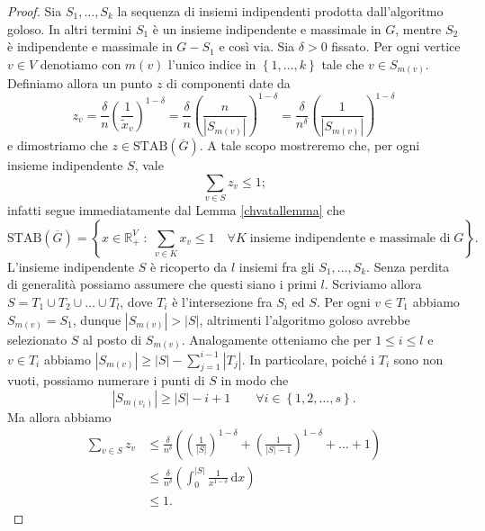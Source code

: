 \begin{proof}
  Sia \(S_1,\dots,S_k\) la sequenza di insiemi indipendenti prodotta dall'algoritmo goloso. In altri termini \(S_1\) è un insieme indipendente e massimale in \(G\), mentre \(S_2\) è indipendente e massimale in \(G-S_1\) e così via. Sia \(\delta>0\) fissato. Per ogni vertice \(v\in V\) denotiamo con \(m(v)\) l'unico indice in \(\left\{1,\dots,k\right\}\) tale che \(v\in S_{m(v)}\). Definiamo allora un punto \(z\) di componenti date da
  \[z_v=\frac{\delta}{n}\left(\frac{1}{\tilde{x}_v}\right)^{1-\delta}=\frac{\delta}{n}\left(\frac{n}{|S_{m(v)}|}\right)^{1-\delta}=\frac{\delta}{n^{\delta}}\left(\frac{1}{|S_{m(v)}|}\right)^{1-\delta}\]
  e dimostriamo che \(z\in\text{STAB}(\overline{G})\). A tale scopo mostreremo che, per ogni insieme indipendente \(S\), vale
  \[\sum_{v\in S}{z_v}\le 1\text{;}\]
  infatti segue immediatamente dal Lemma \ref{chvatallemma} che
  \[
  \text{STAB}(\overline{G}) = \left\{x\in \mathbb{R}_{+}^V\;:\;\sum_{v\in K}{x_v}\le 1\quad \forall K\;\text{insieme indipendente e massimale di}\;G\right\}\text{.}
  \]
  L'insieme indipendente \(S\) è ricoperto da \(l\) insiemi fra gli \(S_1,\dots,S_k\). Senza perdita di generalità possiamo assumere che questi siano i primi \(l\). Scriviamo allora \(S=T_1\cup T_2\cup\dots\cup T_l\), dove \(T_i\) è l'intersezione fra \(S_i\) ed \(S\). Per ogni \(v\in T_1\) abbiamo \(S_{m(v)}=S_1\), dunque \(|S_{m(v)}|>|S|\), altrimenti l'algoritmo goloso avrebbe selezionato \(S\) al posto di \(S_{m(v)}\). Analogamente otteniamo che per \(1\le i\le l\) e \(v\in T_i\) abbiamo \(|S_{m(v)}|\ge |S|-\sum_{j=1}^{i-1}{|T_j|}\). In particolare, poiché i \(T_i\) sono non vuoti, possiamo numerare i punti di \(S\) in modo che
  \[
  |S_{m(v_i)}| \ge |S| - i + 1\qquad\forall i\in\left\{1,2,\dots,s\right\}\text{.}
  \]
  Ma allora abbiamo
  \begin{align}
    \sum_{v\in S}{z_v} &\le \frac{\delta}{n^{\delta}}\left(\left(\frac{1}{|S|}\right)^{1-\delta}+\left(\frac{1}{|S|-1}\right)^{1-\delta}+\dots+1\right) \nonumber \\
    &\le \frac{\delta}{n^{\delta}}\left(\int_{0}^{|S|}{\frac{1}{x^{1-\delta}}\,\mathrm{d}x}\right) \nonumber \\
    &\le 1\text{.} \nonumber
  \end{align}
  

\end{proof}
